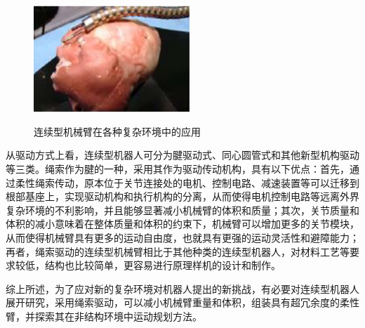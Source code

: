 \begin{figure}[h]
	\hspace{1em}%
	{\includegraphics[height=4cm]{figures/app_surgery.png}}
	\caption{连续型机械臂在各种复杂环境中的应用}
	\label{fig:apps}
\end{figure}

从驱动方式上看，连续型机器人可分为腱驱动式、同心圆管式和其他新型机构驱动等三类。绳索作为腱的一种，采用其作为驱动传动机构，具有以下优点：首先，通过柔性绳索传动，原本位于关节连接处的电机、控制电路、减速装置等可以迁移到根部基座上，实现驱动机构和执行机构的分离，从而使得电机控制电路等远离外界复杂环境的不利影响，并且能够显著减小机械臂的体积和质量；其次，关节质量和体积的减小意味着在整体质量和体积的约束下，机械臂可以增加更多的关节模块，从而使得机械臂具有更多的运动自由度，也就具有更强的运动灵活性和避障能力；再者，绳索驱动的连续型机械臂相比于其他种类的连续型机器人，对材料工艺等要求较低，结构也比较简单，更容易进行原理样机的设计和制作。

综上所述，为了应对新的复杂环境对机器人提出的新挑战，有必要对连续型机器人展开研究，采用绳索驱动，可以减小机械臂重量和体积，组装具有超冗余度的柔性臂，并探索其在非结构环境中运动规划方法。

